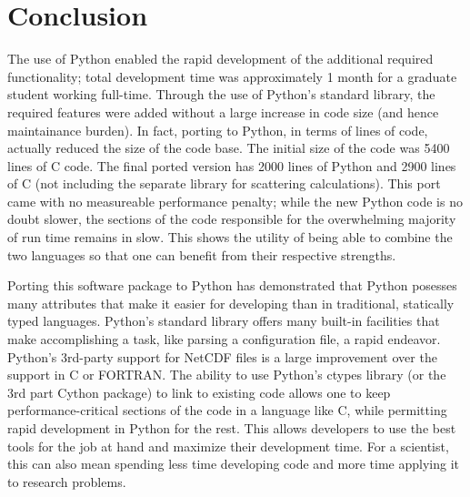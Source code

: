 \documentclass[twocolumn]{article}
\begin{document}
\section{Conclusion}
The use of Python enabled the rapid development of the additional required
functionality; total development time was approximately 1 month for a graduate
student working full-time. Through the use of Python's standard library, the required
features were added without a large increase in code size (and hence maintainance
burden).  In fact, porting to Python, in terms of lines of code, actually reduced
the size of the code base. The initial size of the code was 5400 lines of C code.
The final ported version has 2000 lines of Python and 2900 lines of C (not including
the separate library for scattering calculations). This port came with no measureable
performance penalty; while the new Python code is no doubt slower, the sections of
the code responsible for the overwhelming majority of run time remains in slow.
This shows the utility of being able to combine the two languages so that one
can benefit from their respective strengths.

Porting this software package to Python has demonstrated that Python posesses
many attributes that make it easier for developing than in traditional, statically
typed languages. Python's standard library offers many built-in facilities that
make accomplishing a task, like parsing a configuration file, a rapid endeavor.
Python's 3rd-party support for NetCDF files is a large improvement over the
support in C or FORTRAN.  The ability to use Python's ctypes library (or the
3rd part Cython package) to link to existing code allows one to keep
performance-critical sections of the code in a language like C, while permitting
rapid development in Python for the rest. This allows developers to use the best
tools for the job at hand and maximize their development time. For a scientist,
this can also mean spending less time developing code and more time applying
it to research problems.

\end{document}
